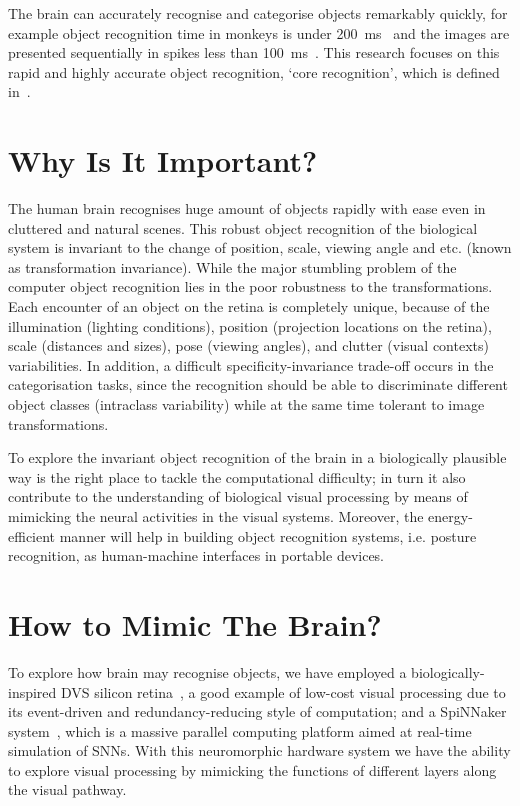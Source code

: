 The brain can accurately recognise and categorise objects remarkably quickly, for example object recognition time in monkeys is under 200~ms~\cite{fabre1998rapid} and the images are presented sequentially in spikes less than 100~ms~\cite{keysers2001speed}.
This research focuses on this rapid and highly accurate object recognition, `core recognition', which is defined in~\cite{dicarlo2007untangling}.


\section{Why Is It Important?}
\label{sec:imp}
The human brain recognises huge amount of objects rapidly with ease even in cluttered and natural scenes.
This robust object recognition of the biological system is invariant to the change of position, scale, viewing angle and etc. (known as transformation invariance).
While the major stumbling problem of the computer object recognition lies in the poor robustness to the transformations.
Each encounter of an object on the retina is completely unique, because of the illumination (lighting conditions), position (projection locations on the retina), scale (distances and sizes), pose (viewing angles), and clutter (visual contexts) variabilities.
In addition, a difficult specificity-invariance trade-off occurs in the categorisation tasks, since the recognition should be able to discriminate different object classes (intraclass variability) while at the same time tolerant to image transformations.   

To explore the invariant object recognition of the brain in a biologically plausible way is the right place to tackle the computational difficulty;
in turn it also contribute to the understanding of biological visual processing by means of mimicking the neural activities in the visual systems.
Moreover, the energy-efficient manner will help in building object recognition systems, i.e. posture recognition, as human-machine interfaces in portable devices.  

\section{How to Mimic The Brain?}
\label{sec:brn}
To explore how brain may recognise objects, we have employed a biologically-inspired DVS silicon retina~\cite{lenero20113}, a good example of low-cost visual processing due to its event-driven and redundancy-reducing style of computation;
and a SpiNNaker system~\cite{furber2014spinnaker}, which is a massive parallel computing platform aimed at real-time simulation of SNNs. 
With this neuromorphic hardware system we have the ability to explore visual processing by mimicking the functions of different layers along the visual pathway. 


